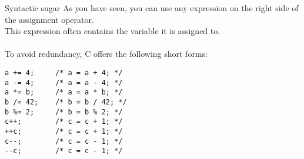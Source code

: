 \begin{frame}[fragile]{Syntactic sugar}
	As you have seen, you can use any expression on the right side of the assignment operator.\\
	This expression often contains the variable it is assigned to.\\\ \\
	To avoid redundancy, C offers the following short forms:\\
	\begin{lstlisting}[numbers=none]
a += 4;		/* a = a + 4; */
a -= 4;		/* a = a - 4; */
a *= b;		/* a = a * b; */
b /= 42;	/* b = b / 42; */
b %= 2;		/* b = b % 2; */
c++;		/* c = c + 1; */
++c;		/* c = c + 1; */
c--;		/* c = c - 1; */
--c;		/* c = c - 1; */
\end{lstlisting}
\end{frame}


